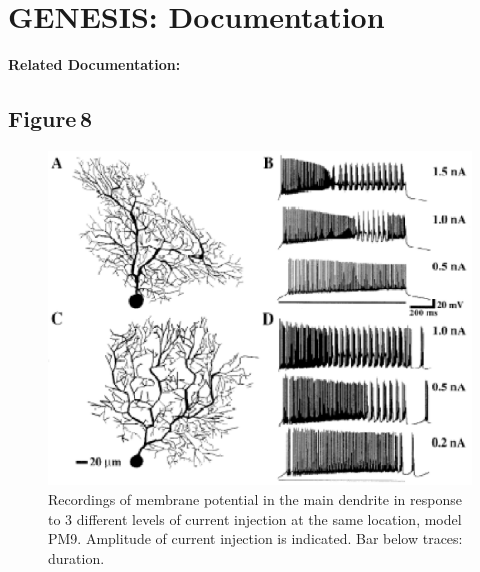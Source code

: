 \documentclass[12pt]{article}
\begin{document}
\section*{GENESIS: Documentation}

{\bf Related Documentation:}

\subsection*{Figure\,8}

\begin{figure}[h]
\centering
   \includegraphics[scale=1]{figures/Fig.1.8.eps}
   \caption{Recordings of membrane potential in the main dendrite in response
to 3 different levels of current injection at the same location, model
PM9. Amplitude of current injection is indicated. Bar below traces: duration.}
   \label{fig:DS1.8}
\end{figure}



\end{document}

